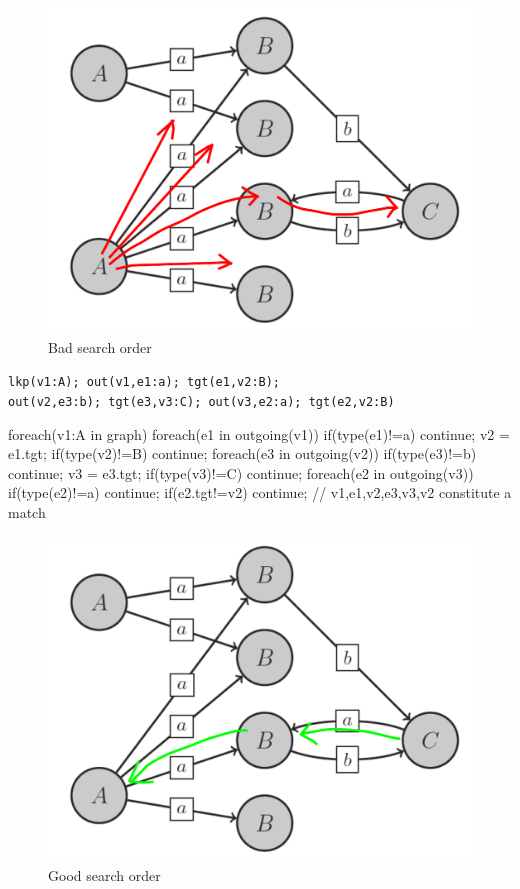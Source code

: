 \begin{figure}[htbp]
  \centering
  \includegraphics[width=\textwidth]{fig/GraphBad}
  \caption{Bad search order}
  \label{figbadsearch}
\end{figure}

\texttt{lkp(v1:A); out(v1,e1:a); tgt(e1,v2:B);}\\
\texttt{out(v2,e3:b); tgt(e3,v3:C); out(v3,e2:a); tgt(e2,v2:B)}

\begin{csharp}
foreach(v1:A in graph) {
	foreach(e1 in outgoing(v1)) {
		if(type(e1)!=a) continue;
		v2 = e1.tgt;
		if(type(v2)!=B) continue;
		foreach(e3 in outgoing(v2)) {
			if(type(e3)!=b) continue;
			v3 = e3.tgt;
			if(type(v3)!=C) continue;
			foreach(e2 in outgoing(v3)) {
				if(type(e2)!=a) continue;
				if(e2.tgt!=v2) continue;
				// v1,e1,v2,e3,v3,v2 constitute a match
			} 
		}
	}
}
\end{csharp}

\begin{figure}[htbp]
  \centering
  \includegraphics[width=\textwidth]{fig/GraphGood}
  \caption{Good search order}
  \label{figgoodsearch}
\end{figure}

